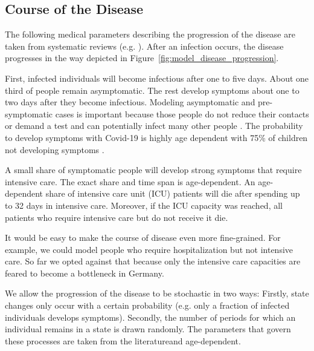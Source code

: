 \subsection{Course of the Disease}
\label{sub:disease_progression}

The following medical parameters describing the progression of the disease are taken from
systematic reviews (e.g. \citet{He2020}). After an infection occurs, the disease
progresses in the way depicted in Figure~\ref{fig:model_disease_progression}.


First, infected individuals will become infectious after one to five days. About one
third of people remain asymptomatic. The rest develop symptoms about one to two days
after they become infectious. Modeling asymptomatic and pre-symptomatic cases is
important because those people do not reduce their contacts or demand a test and can
potentially infect many other people \citep{Donsimoni2020}. The probability to develop
symptoms with Covid-19 is highly age dependent with 75\% of children not developing
symptoms \citep{Davies2020}.

A small share of symptomatic people will develop strong symptoms that require intensive
care. The exact share and time span is age-dependent. An age-dependent share of intensive
care unit (ICU) patients will die after spending up to 32 days in intensive care.
Moreover, if the ICU capacity was reached, all patients who require intensive care but do
not receive it die.

It would be easy to make the course of disease even more fine-grained. For example, we
could model people who require hospitalization but not intensive care. So far we opted
against that because only the intensive care capacities are feared to become a bottleneck
in Germany.

We allow the progression of the disease to be stochastic in two ways: Firstly, state
changes only occur with a certain probability (e.g. only a fraction of infected
individuals develops symptoms). Secondly, the number of periods for which an individual
remains in a state is drawn randomly. The parameters that govern these processes are
taken from the literature\footnotemark and age-dependent.

